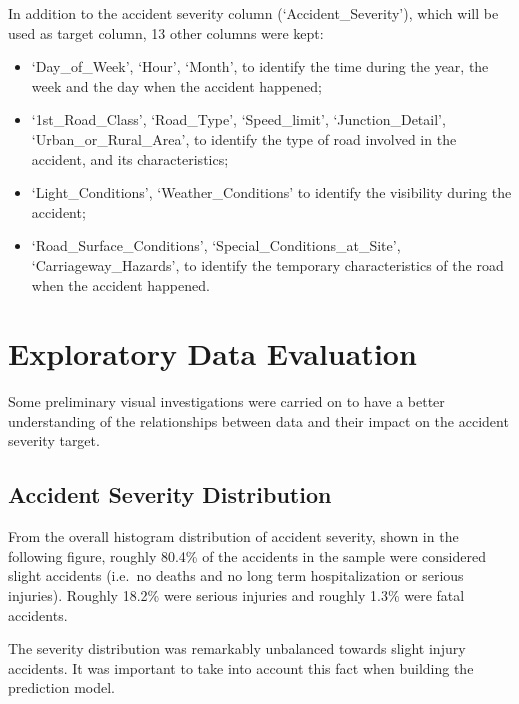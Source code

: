 \documentclass[11pt]{article}
\begin{document}
In addition to the accident severity column (`Accident\_Severity'), which will be used as target column, 13 other columns were kept:
\begin{itemize}
\item
`Day\_of\_Week', `Hour', `Month', to identify the time during the year, the week and the day when the accident happened;
\item
`1st\_Road\_Class', `Road\_Type', `Speed\_limit', `Junction\_Detail', `Urban\_or\_Rural\_Area', to identify the type of road involved in the accident, and its characteristics;
\item
`Light\_Conditions', `Weather\_Conditions' to identify the visibility during the accident;
\item
`Road\_Surface\_Conditions', `Special\_Conditions\_at\_Site', `Carriageway\_Hazards', to identify the temporary characteristics of the road when the accident happened.
\end{itemize}

    \hypertarget{data-evaluation}{%
\section{Exploratory Data Evaluation}\label{data-evaluation}}

Some preliminary visual investigations were carried on to have a better understanding of the relationships between data and their impact on the accident severity target.

    \hypertarget{accident-severity-distribution}{%
\subsection{Accident Severity Distribution}\label{accident-severity-distribution}}

From the overall histogram distribution of accident severity, shown in the following figure, roughly 80.4\% of the accidents in the sample were considered slight accidents (i.e.~no deaths and no long term hospitalization or serious injuries). Roughly 18.2\% were serious injuries and roughly 1.3\% were fatal accidents.

The severity distribution was remarkably unbalanced towards slight injury accidents. It was important to take into account this fact when building the prediction model.

    \begin{center}
    \end{center}
\end{document}
